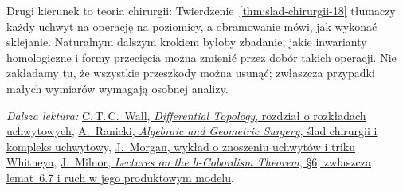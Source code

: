 Drugi kierunek to teoria chirurgii:
Twierdzenie~\ref{thm:slad-chirurgii-18}
tłumaczy każdy uchwyt na operację
na poziomicy, a obramowanie mówi,
jak wykonać sklejanie. Naturalnym dalszym krokiem byłoby zbadanie, jakie
inwarianty homologiczne i formy
przecięcia można zmienić przez
dobór takich operacji.
Nie zakładamy tu, że wszystkie
przeszkody można usunąć;
zwłaszcza przypadki małych
wymiarów wymagają osobnej analizy.

\par\smallskip
{\footnotesize\noindent\emph{Dalsza lektura:}
\href{https://www.cambridge.org/core/books/differential-topology/theory-of-handle-decompositions/BA54EF1BD9B755DFA2B363176B0CA2F7}{C.\,T.\,C.\ Wall, \emph{Differential Topology}, rozdział o rozkładach uchwytowych},
\href{https://webhomes.maths.ed.ac.uk/~v1ranick/books/surgery.pdf}{A.\ Ranicki, \emph{Algebraic and Geometric Surgery}, ślad chirurgii i kompleks uchwytowy},
\href{https://www.math.columbia.edu/~jmorgan/Lecture_IIIA_hcobordism_Contd.pdf}{J.\ Morgan, wykład o znoszeniu uchwytów i triku Whitneya},
\href{https://webhomes.maths.ed.ac.uk/~v1ranick/surgery/hcobord.pdf}{J.\ Milnor, \emph{Lectures on the h-Cobordism Theorem}, \S6, zwłaszcza lemat~6.7 i ruch w jego produktowym modelu}.\par}
